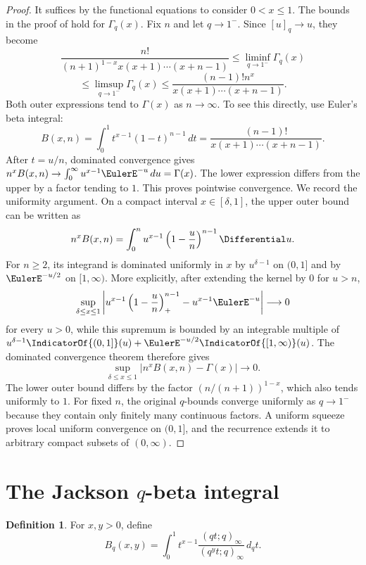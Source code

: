 \documentclass[11pt,a4paper,oneside,openany]{book}
\theoremstyle{definition}
\newtheorem{definition}[definition]{Definition}
\theoremstyle{remark}
\begin{document}
\begin{proof}
It suffices by the functional equations to consider $0<x\le1$.  The bounds in the proof of  hold for $\Gamma_q(x)$.  Fix $n$ and let $q\to1^-$.  Since $[u]_q\to u$, they become
\[
 \frac{n!}{(n+1)^{1-x}x(x+1)\cdots(x+n-1)}
 \le \liminf_{q\to1^-}\Gamma_q(x)
\]
\[
 \le\limsup_{q\to1^-}\Gamma_q(x)
 \le\frac{(n-1)!n^x}{x(x+1)\cdots(x+n-1)}.
\]
Both outer expressions tend to $\Gamma(x)$ as $n\to\infty$.  To see this directly, use Euler's beta integral:
\[
 B(x,n)=\int_0^1t^{x-1}(1-t)^{n-1}\,dt
 =\frac{(n-1)!}{x(x+1)\cdots(x+n-1)}.
\]
After $t=u/n$, dominated convergence gives $n^xB(x,n)\to\int_0^\infty u^{x-1}\EulerE^{-u}\,du=\Gamma(x)$.  The lower expression differs from the upper by a factor tending to $1$.  This proves pointwise convergence.  We record the uniformity argument.  On a compact interval $x\in[\delta,1]$, the upper outer bound can be written as
\[
 n^xB(x,n)=\int_0^n u^{x-1}\left(1-\frac un\right)^{n-1}\Differential u.
\]
For $n\ge2$, its integrand is dominated uniformly in $x$ by $u^{\delta-1}$ on $(0,1]$ and by $\EulerE^{-u/2}$ on $[1,\infty)$.  More explicitly, after extending the kernel by $0$ for $u>n$,
\[
 \sup_{\delta\le x\le1}
 \left|u^{x-1}\left(1-\frac un\right)_{+}^{n-1}
       -u^{x-1}\EulerE^{-u}\right|
 \longrightarrow0
\]
for every $u>0$, while this supremum is bounded by an integrable
multiple of $u^{\delta-1}\IndicatorOf{(0,1]}(u)+\EulerE^{-u/2}\IndicatorOf{[1,\infty)}(u)$.
The dominated convergence theorem therefore gives
\[
 \sup_{\delta\le x\le1}
 \left|n^xB(x,n)-\Gamma(x)\right|\longrightarrow0.
\]
The lower outer bound differs by the factor $(n/(n+1))^{1-x}$, which also tends uniformly to $1$.  For fixed $n$, the original $q$-bounds converge uniformly as $q\to1^-$ because they contain only finitely many continuous factors.  A uniform squeeze proves local uniform convergence on $(0,1]$, and the recurrence extends it to arbitrary compact subsets of $(0,\infty)$.
\end{proof}

\section{The Jackson \texorpdfstring{$q$}{q}-beta integral}

\begin{definition}
For $x,y>0$, define
\[
 B_q(x,y)=\int_0^1 t^{x-1}
 \frac{(qt;q)_\infty}{(q^yt;q)_\infty}\,d_qt.
\]
\end{definition}
\end{document}
